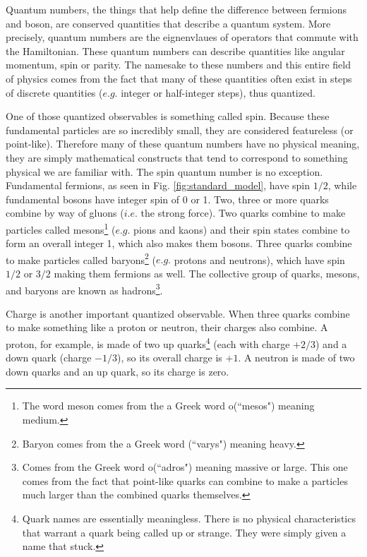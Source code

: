 Quantum numbers, the things that help define the difference between fermions and boson, are conserved quantities that describe a quantum system. More precisely, quantum numbers are the eignenvlaues of operators that commute with the Hamiltonian. These quantum numbers can describe quantities like angular momentum, spin or parity. The namesake to these numbers and this entire field of physics comes from the fact that many of these quantities often exist in steps of discrete quantities ($e.g.$ integer or half-integer steps), thus quantized.

One of those quantized observables is something called spin. Because these fundamental particles are so incredibly small, they are considered featureless (or point-like). Therefore many of these quantum numbers have no physical meaning, they are simply mathematical constructs that tend to correspond to something physical we are familiar with. The spin quantum number is no exception. Fundamental fermions, as seen in Fig. \ref{fig:standard_model}, have spin $1/2$, while fundamental bosons have integer spin of 0 or 1. Two, three or more quarks combine by way of gluons ($i.e.$ the strong force). Two quarks combine to make particles called mesons\footnote{The word meson comes from the a Greek word \textmu \textepsilon \textsigma o\textsigma  (``mesos") meaning medium.}  ($e.g.$ pions and kaons) and their spin states combine to form an overall integer 1, which also makes them bosons. Three quarks combine to make particles called baryons\footnote{Baryon comes from the a Greek word \textbeta \textalpha \textrho \textupsilon \textsigma (``varys") meaning heavy.} ($e.g.$ protons and neutrons), which have spin $1/2$ or $3/2$ making them fermions as well. The collective group of quarks, mesons, and baryons are known as hadrons\footnote{Comes from the Greek word  \textalpha \textdelta \textrho o\textsigma (``adros") meaning massive or large. This one comes from the fact that point-like quarks can combine to make a particles much larger than the combined quarks themselves.}.

Charge is another important quantized observable. When three quarks combine to make something like a proton or neutron, their charges also combine. A proton, for example, is made of two up quarks\footnote{Quark names are essentially meaningless. There is no physical characteristics that warrant a quark being called up or strange. They were simply given a name that stuck.} (each with charge $+2/3$) and a down quark (charge $-1/3$), so its overall charge is $+1$. A neutron is made of two down quarks and an up quark, so its charge is zero.

